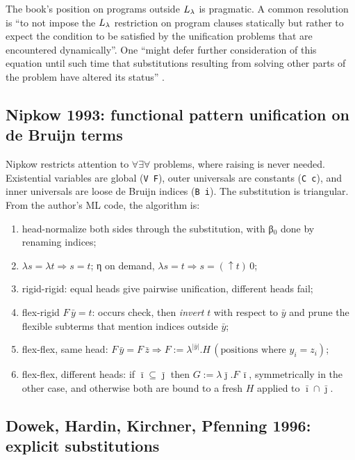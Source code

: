 \noindent The book's position on programs outside $L_\lambda$ is pragmatic. A common resolution is
\enquote{to not impose the $L_\lambda$ restriction on program clauses statically but rather to expect the
condition to be satisfied by the unification problems that are encountered dynamically}. One
\enquote{might defer further consideration of this equation until such time that substitutions
resulting from solving other parts of the problem have altered its status} .

\subsection{Nipkow 1993: functional pattern unification on de Bruijn terms}

Nipkow \cite{Nipkow1993} restricts attention to $\forall\exists\forall$ problems, where raising is never
needed. Existential variables are global (\texttt{V F}), outer universals are constants (\texttt{C c}),
and inner universals are loose de Bruijn indices (\texttt{B i}). The substitution is triangular. From
the author's ML code, the algorithm is:
\begin{enumerate}
  \item head-normalize both sides through the substitution, with β$_0$ done by renaming indices;
  \item $\lambda s=\lambda t\Rightarrow s=t$; η on demand, $\lambda s=t\Rightarrow s=(\uparrow t)\,0$;
  \item rigid-rigid: equal heads give pairwise unification, different heads fail;
  \item flex-rigid $F\,\bar y=t$: occurs check, then \emph{invert} $t$ with respect to $\bar y$ and
    prune the flexible subterms that mention indices outside $\bar y$;
  \item flex-flex, same head: $F\,\bar y=F\,\bar z\Rightarrow F:=\lambda^{|\bar y|}.H\,(\text{positions where }y_i=z_i)$;
  \item flex-flex, different heads: if $\bar\imath\subseteq\bar\jmath$ then $G:=\lambda\bar\jmath.F\,\bar\imath$,
    symmetrically in the other case, and otherwise both are bound to a fresh $H$ applied to
    $\bar\imath\cap\bar\jmath$.
\end{enumerate}

\subsection{Dowek, Hardin, Kirchner, Pfenning 1996: explicit substitutions}\label{sec:lkanren-dhkp}

